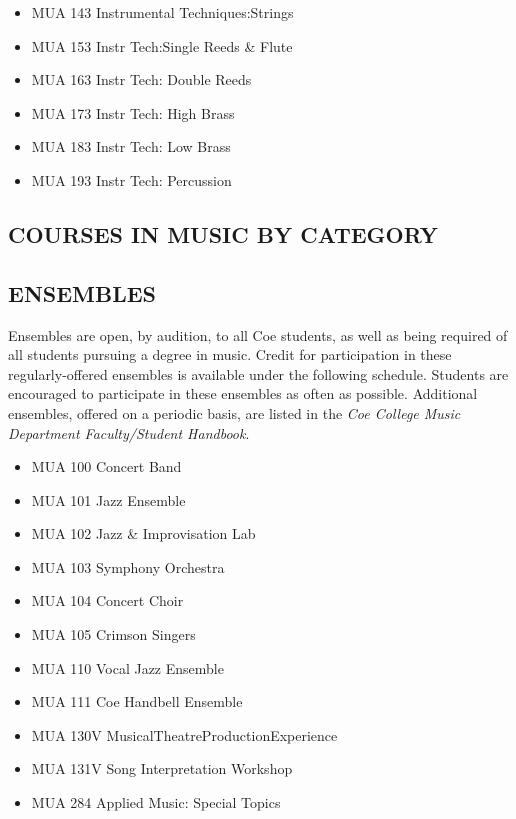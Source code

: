 \documentclass[
  letterpaper,
]{scrbook}
\providecommand{\tightlist}{%
  \setlength{\itemsep}{0pt}\setlength{\parskip}{0pt}}
\begin{document}
\begin{itemize}
\tightlist
\item
  MUA 143 Instrumental Techniques:Strings
\item
  MUA 153 Instr Tech:Single Reeds \& Flute
\item
  MUA 163 Instr Tech: Double Reeds
\item
  MUA 173 Instr Tech: High Brass
\item
  MUA 183 Instr Tech: Low Brass
\item
  MUA 193 Instr Tech: Percussion
\end{itemize}

\subsection{COURSES IN MUSIC BY
CATEGORY}\label{courses-in-music-by-category}

\subsection{ENSEMBLES}\label{ensembles}

Ensembles are open, by audition, to all Coe students, as well as being
required of all students pursuing a degree in music. Credit for
participation in these regularly-offered ensembles is available under
the following schedule. Students are encouraged to participate in these
ensembles as often as possible. Additional ensembles, offered on a
periodic basis, are listed in the \emph{Coe College Music Department
Faculty/Student Handbook}.

\begin{itemize}
\tightlist
\item
  MUA 100 Concert Band
\item
  MUA 101 Jazz Ensemble
\item
  MUA 102 Jazz \& Improvisation Lab
\item
  MUA 103 Symphony Orchestra
\item
  MUA 104 Concert Choir
\item
  MUA 105 Crimson Singers
\item
  MUA 110 Vocal Jazz Ensemble
\item
  MUA 111 Coe Handbell Ensemble
\item
  MUA 130V MusicalTheatreProductionExperience
\item
  MUA 131V Song Interpretation Workshop
\item
  MUA 284 Applied Music: Special Topics
\end{itemize}
\end{document}
